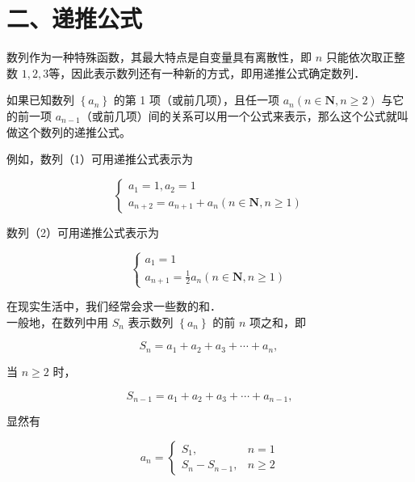 \documentclass[10pt]{article}
\begin{document}
\section*{二、递推公式}
数列作为一种特殊函数，其最大特点是自变量具有离散性，即 \(n\) 只能依次取正整数 \(1,2,3\)等，因此表示数列还有一种新的方式，即用递推公式确定数列．

如果已知数列 \(\left\{a_{n}\right\}\) 的第 1 项（或前几项），且任一项 \(a_{n}(n \in \mathbf{N}, n \geqslant 2)\) 与它的前一项 \(a_{n-1}\)（或前几项）间的关系可以用一个公式来表示，那么这个公式就叫做这个数列的递推公式。

例如，数列（1）可用递推公式表示为

\[
\left\{\begin{array}{l}
a_{1}=1, a_{2}=1 \\
a_{n+2}=a_{n+1}+a_{n}(n \in \mathbf{N}, n \geqslant 1)
\end{array}\right.
\]

数列（2）可用递推公式表示为

\[
\left\{\begin{array}{l}
a_{1}=1 \\
a_{n+1}=\frac{1}{2} a_{n}(n \in \mathbf{N}, n \geqslant 1)
\end{array}\right.
\]

在现实生活中，我们经常会求一些数的和．\\
一般地，在数列中用 \(S_{n}\) 表示数列 \(\left\{a_{n}\right\}\) 的前 \(n\) 项之和，即

\[
S_{n}=a_{1}+a_{2}+a_{3}+\cdots+a_{n} \text {, }
\]

当 \(n \geqslant 2\) 时，

\[
S_{n-1}=a_{1}+a_{2}+a_{3}+\cdots+a_{n-1},
\]

显然有

\[
a_{n}= \begin{cases}S_{1}, & n=1 \\ S_{n}-S_{n-1}, & n \geqslant 2\end{cases}
\]
\end{document}
